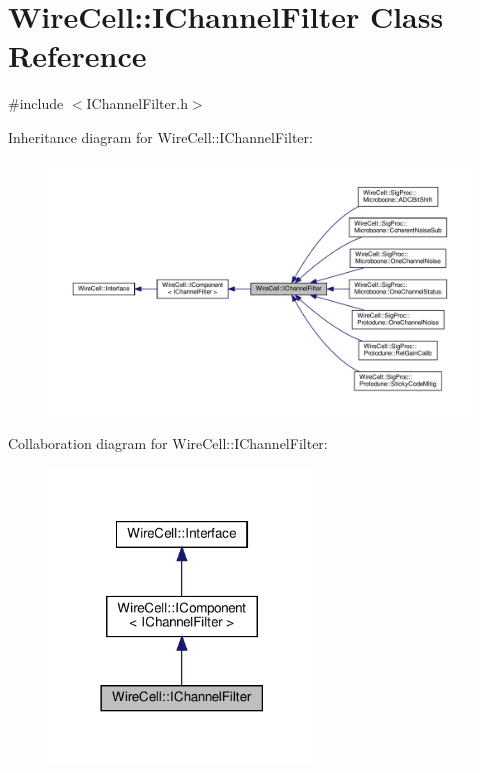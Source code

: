 \hypertarget{class_wire_cell_1_1_i_channel_filter}{}\section{Wire\+Cell\+:\+:I\+Channel\+Filter Class Reference}
\label{class_wire_cell_1_1_i_channel_filter}


{\ttfamily \#include $<$I\+Channel\+Filter.\+h$>$}



Inheritance diagram for Wire\+Cell\+:\+:I\+Channel\+Filter\+:
\nopagebreak
\begin{figure}[H]
\begin{center}
\leavevmode
\includegraphics[width=350pt]{class_wire_cell_1_1_i_channel_filter__inherit__graph}
\end{center}
\end{figure}


Collaboration diagram for Wire\+Cell\+:\+:I\+Channel\+Filter\+:
\nopagebreak
\begin{figure}[H]
\begin{center}
\leavevmode
\includegraphics[width=201pt]{class_wire_cell_1_1_i_channel_filter__coll__graph}
\end{center}
\end{figure}
